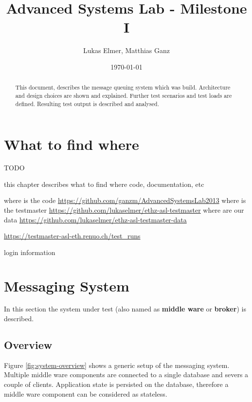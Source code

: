 \documentclass[a4paper]{article}
\title{Advanced Systems Lab - Milestone I}
\author{Lukas Elmer, Matthias Ganz}
\date{\today}
\begin{document}
\maketitle


\begin{abstract}

This document, describes the message queuing system which was build. Architecture and design choices are shown and explained. Further test scenarios and test loads are defined. Resulting test output is described and analysed.

\end{abstract}

\section{What to find where}

TODO 

this chapter describes what to find where code, documentation, etc

where is the code
\url{https://github.com/ganzm/AdvancedSystemsLab2013}
where is the testmaster
\url{https://github.com/lukaselmer/ethz-asl-testmaster}
where are our data
\url{https://github.com/lukaselmer/ethz-asl-testmaster-data}

\url{https://testmaster-asl-eth.renuo.ch/test_runs}

login information

\section{Messaging System}
In this section the system under test (also named as \textbf{middle ware}  or \textbf{broker}) is described.


\subsection{Overview}

Figure \ref{fig:system-overview} shows a generic setup of the messaging system. Multiple middle ware components are connected to a single database and severs a couple of clients. Application state is persisted on the database, therefore a middle ware component can be considered as stateless.
\end{document}
